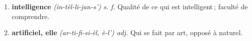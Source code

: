 \begin{tcolorbox}[title= Définitions françaises des dictionnaire Littré]
\begin{enumerate}
    \item {\textbf{intelligence}
\textit{(in-tèl-li-jan-s') s. f.}
Qualité de ce qui est intelligent ; faculté de comprendre.
}
    \item {\textbf{artificiel, elle}
\textit{(ar-ti-fi-si-èl, è-l') adj.}
Qui se fait par art, opposé à naturel.
}
\end{enumerate}

\end{tcolorbox}
\pagebreak
